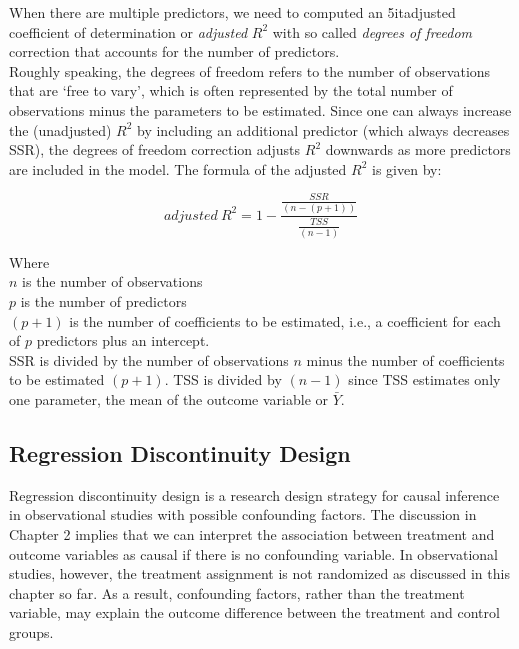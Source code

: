 \documentclass{article}
\begin{document}
    \noindent When there are multiple predictors, we need to computed an \tex
5it{adjusted coefficient of determination} or \textit{adjusted} $R^2$ with
so called \textit{degrees of freedom} correction that accounts for the number of predictors.\\

    \noindent Roughly speaking, the degrees of freedom refers to the number
of observations that are `free to vary', which is often represented by the
total number of observations minus the parameters to be estimated. Since one
can always increase the (unadjusted) $R^2$ by including an additional
predictor (which always decreases SSR), the degrees of freedom correction
adjusts $R^2$ downwards as more predictors are included in the model. The
formula of the adjusted $R^2$ is given by:

    \[
        adjusted \ R^2 = 1 - \frac{\frac{SSR}{(n-(p+1))}}{\frac{TSS}{(n-1)}}
    \]

    \indent Where\\
    \indent \indent $n$ is the number of observations\\
    \indent \indent $p$ is the number of predictors\\
    \indent \indent $(p+1)$ is the number of coefficients to be estimated,
i.e., a coefficient for each of $p$ predictors plus an intercept.\\

    \noindent SSR is divided by the number of observations $n$ minus the
number of coefficients to be estimated $(p+1)$. TSS is divided by $(n-1)$
since TSS estimates only one parameter, the mean of the outcome variable or $\bar{Y}$.

    \subsection{Regression Discontinuity Design}

    \noindent Regression discontinuity design is a research design strategy
for causal inference in observational studies with possible confounding
factors. The discussion in Chapter 2 implies that we can interpret the
association between treatment and outcome variables as causal if there is no
confounding variable. In observational studies, however, the treatment
assignment is not randomized as discussed in this chapter so far. As a
result, confounding factors, rather than the treatment variable, may explain
the outcome difference between the treatment and control groups.\\
\end{document}
